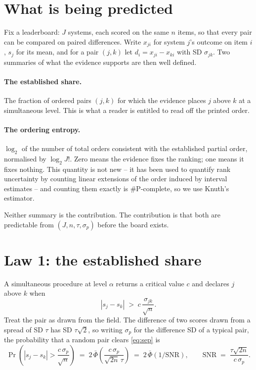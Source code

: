 \documentclass[10pt]{article}
\begin{document}
\section{What is being predicted}

Fix a leaderboard: $J$ systems, each scored on the same $n$ items, so that
every pair can be compared on paired differences. Write $x_{ji}$ for system
$j$'s outcome on item $i$, $s_j$ for its mean, and for a pair $(j,k)$ let
$d_i = x_{ji} - x_{ki}$ with SD $\sigma_{jk}$. Two summaries of what the
evidence supports are then well defined.

\paragraph{The established share.} The fraction of ordered pairs $(j,k)$
for which the evidence places $j$ above $k$ at a simultaneous level. This
is what a reader is entitled to read off the printed order.

\paragraph{The ordering entropy.} $\log_2$ of the number of total orders
consistent with the established partial order, normalised by $\log_2 J!$.
Zero means the evidence fixes the ranking; one means it fixes nothing.
This quantity is not new -- it has been used to quantify rank uncertainty by
counting linear extensions of the order induced by interval estimates
\citep{uncertaintyranking} -- and counting them exactly is \#P-complete, so
we use Knuth's estimator.

Neither summary is the contribution. The contribution is that both are
predictable from $(J, n, \tau, \sigma_p)$ before the board exists.

\section{Law 1: the established share}

A simultaneous procedure at level $\alpha$ returns a critical value $c$ and
declares $j$ above $k$ when
\begin{equation}
|s_j - s_k| \;>\; c\,\frac{\sigma_{jk}}{\sqrt{n}} .
\label{eq:sep}
\end{equation}
Treat the pair as drawn from the field. The difference of two scores drawn
from a spread of SD $\tau$ has SD $\tau\sqrt{2}$, so writing $\sigma_p$ for
the difference SD of a typical pair, the probability that a random pair
clears \eqref{eq:sep} is
\begin{equation}
\Pr\!\left(|s_j - s_k| > \frac{c\,\sigma_p}{\sqrt{n}}\right)
\;=\; 2\,\bar\Phi\!\left(\frac{c\,\sigma_p}{\sqrt{2n}\,\tau}\right)
\;=\; 2\,\bar\Phi(1/\mathrm{SNR}),
\qquad
\mathrm{SNR} \;=\; \frac{\tau\sqrt{2n}}{c\,\sigma_p} .
\label{eq:law1}
\end{equation}
\end{document}
